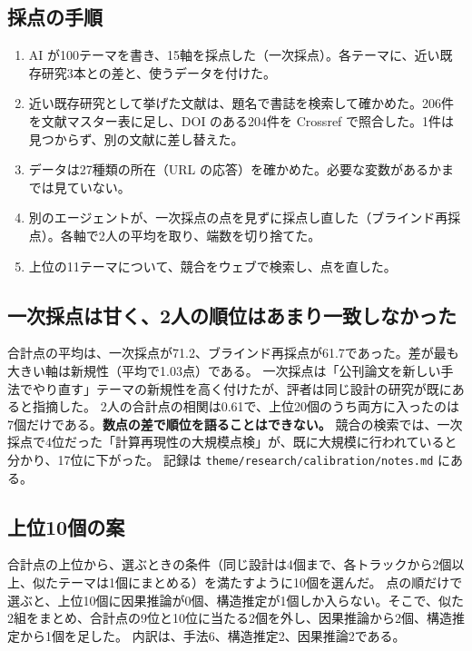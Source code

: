 \documentclass[a4paper,10pt]{ltjsarticle}
\begin{document}
\subsection{採点の手順}

\begin{enumerate}[leftmargin=*]
  \item AI が100テーマを書き、15軸を採点した（一次採点）。各テーマに、近い既存研究3本との差と、使うデータを付けた。
  \item 近い既存研究として挙げた文献は、題名で書誌を検索して確かめた。206件を文献マスター表に足し、DOI のある204件を Crossref で照合した。1件は見つからず、別の文献に差し替えた。
  \item データは27種類の所在（URL の応答）を確かめた。必要な変数があるかまでは見ていない。
  \item 別のエージェントが、一次採点の点を見ずに採点し直した（ブラインド再採点）。各軸で2人の平均を取り、端数を切り捨てた。
  \item 上位の11テーマについて、競合をウェブで検索し、点を直した。
\end{enumerate}

\subsection{一次採点は甘く、2人の順位はあまり一致しなかった}

合計点の平均は、一次採点が71.2、ブラインド再採点が61.7であった。差が最も大きい軸は新規性（平均で1.03点）である。
一次採点は「公刊論文を新しい手法でやり直す」テーマの新規性を高く付けたが、評者は同じ設計の研究が既にあると指摘した。
2人の合計点の相関は0.61で、上位20個のうち両方に入ったのは7個だけである。\textbf{数点の差で順位を語ることはできない。}
競合の検索では、一次採点で4位だった「計算再現性の大規模点検」が、既に大規模に行われていると分かり、17位に下がった。
記録は \texttt{theme/research/calibration/notes.md} にある。

\subsection{上位10個の案}

合計点の上位から、選ぶときの条件（同じ設計は4個まで、各トラックから2個以上、似たテーマは1個にまとめる）を満たすように10個を選んだ。
点の順だけで選ぶと、上位10個に因果推論が0個、構造推定が1個しか入らない。そこで、似た2組をまとめ、合計点の9位と10位に当たる2個を外し、因果推論から2個、構造推定から1個を足した。
内訳は、手法6、構造推定2、因果推論2である。
\end{document}
